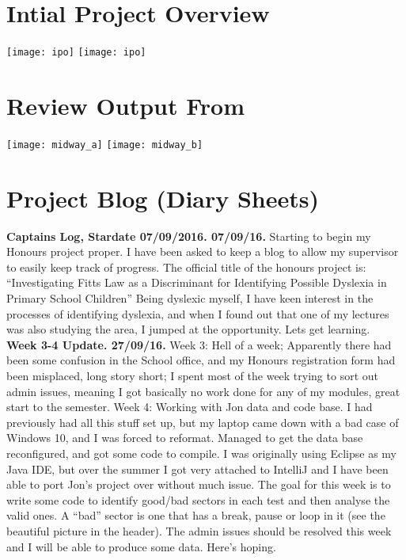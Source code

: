 \newpage
\begin{appendices}
	\section{Intial Project Overview}
		\label{app_ipo}
		\texttt{[image: ipo]}		
		\texttt{[image: ipo]}
		\newpage
		
	\section{Review Output From}
		\label{app_week9}
		\texttt{[image: midway\_a]}
		\texttt{[image: midway\_b]}
		\newpage
		
	\section{Project Blog (Diary Sheets)}
		\label{app_blog}
		\textbf{Captains Log, Stardate 07/09/2016. 07/09/16.}
		Starting to begin my Honours project proper. I have been asked to keep a blog to allow my supervisor to easily keep track of progress.
		The official title of the honours project is:
		“Investigating Fitts Law as a Discriminant for Identifying Possible Dyslexia in Primary School Children”
		Being dyslexic myself, I have keen interest in the processes of identifying dyslexia, and when I found out that one of my lectures was also studying the area, I jumped at the opportunity.
		Lets get learning.\\
		
		\textbf{Week 3-4 Update. 27/09/16.}
		Week 3:
		Hell of a week; Apparently there had been some confusion in the School office, and my Honours registration form had been misplaced, long story short; I spent most of the week trying to sort out admin issues, meaning I got basically no work done for any of my modules, great start to the semester.
		Week 4:
		Working with Jon data and code base. I had previously had all this stuff set up, but my laptop came down with a bad case of Windows 10, and I was forced to reformat. Managed to get the data base reconfigured, and got some code to compile.
		I was originally using Eclipse as my Java IDE, but over the summer I got very attached to IntelliJ and I have been able to port Jon’s project over without much issue.
		The goal for this week is to write some code to identify good/bad sectors in each test and then analyse the valid ones.
		A “bad” sector is one that has a break, pause or loop in it (see the beautiful picture in the header).
		The admin issues should be resolved this week and I will be able to produce some data.
		Here’s hoping.\\
		

\end{appendices}
